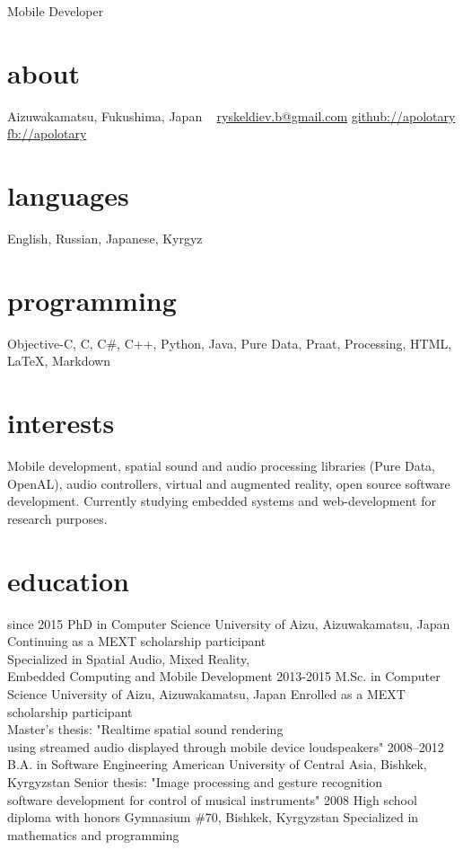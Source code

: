 \documentclass[]{friggeri-cv}
\begin{document}
       {Mobile Developer}

\begin{aside}
  \section{about}
    Aizuwakamatsu,
    Fukushima, Japan
    ~
    \href{mailto:ryskeldiev.b@gmail.com}{ryskeldiev.b@gmail.com}
    \href{https://github.com/Apolotary/}{github://apolotary}
    \href{http://facebook.com/apolotary}{fb://apolotary}
  \section{languages}
	English, Russian,
	Japanese, Kyrgyz
  \section{programming}
	Objective-C, C, C\#,
	C++, Python, Java,
	Pure Data, Praat,
	Processing,
	HTML, LaTeX,
	Markdown
 \end{aside}

\section{interests}

Mobile development, spatial sound and audio processing libraries (Pure Data, OpenAL), audio controllers, virtual and augmented reality, open source software development. Currently studying embedded systems and web-development for research purposes.
\section{education}

\begin{entrylist}
  \entry
    {since 2015}
    {PhD in Computer Science}
    {University of Aizu, Aizuwakamatsu, Japan}
    {Continuing as a MEXT scholarship participant\\
    Specialized in Spatial Audio, Mixed Reality,\\
    Embedded Computing and Mobile Development}
  \entry
    {2013-2015}
    {M.Sc. in Computer Science}
    {University of Aizu, Aizuwakamatsu, Japan}
    {Enrolled as a MEXT scholarship participant\\
    Master's thesis: "Realtime spatial sound rendering\\
     using streamed audio displayed through mobile device loudspeakers"}
  \entry
    {2008–2012}
    {B.A. in Software Engineering}
    {American University of Central Asia, Bishkek, Kyrgyzstan}
    {Senior thesis: "Image processing and gesture recognition\\
     software development for control of musical instruments"}
  \entry
    {2008}
    {High school diploma with honors}
    {Gymnasium \#70, Bishkek, Kyrgyzstan}
    {Specialized in mathematics and programming}
\end{entrylist}
\end{document}
